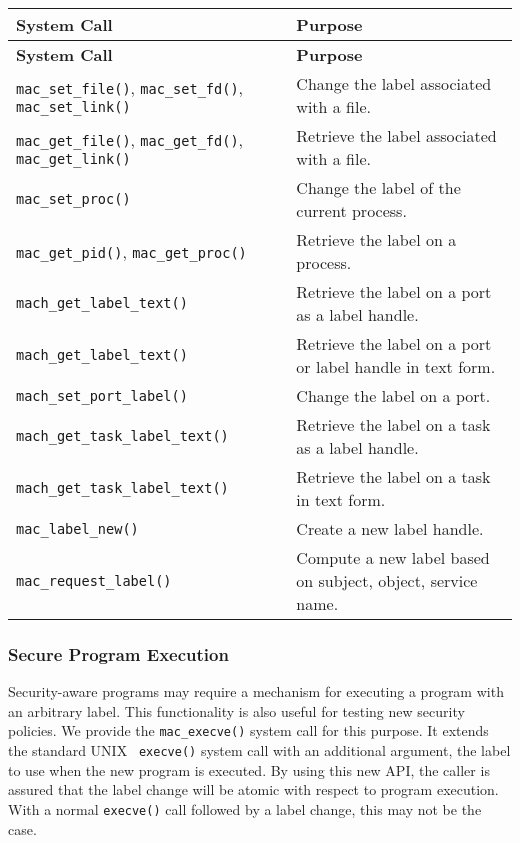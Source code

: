 \begin{longtable}{|p{1.8in}|p{2.2in}|}
\hline
{\bf System Call} & {\bf Purpose} \\
\hline
\hline
\endfirsthead
\hline
{\bf System Call} & {\bf Purpose} \\
\hline
\hline
\endhead
\hline
\endfoot
{\tt mac\_set\_file()}, {\tt mac\_set\_fd()}, {\tt mac\_set\_link()} & Change the label associated with a file. \\[3mm]
\hline
{\tt mac\_get\_file()}, {\tt mac\_get\_fd()}, {\tt mac\_get\_link()} & Retrieve the label associated with a file. \\[3mm]
\hline
{\tt mac\_set\_proc()} & Change the label of the current process. \\[3mm]
\hline
{\tt mac\_get\_pid()}, {\tt mac\_get\_proc()} & Retrieve the label on a process. \\[3mm]
\hline
{\tt mach\_get\_label\_text()} & Retrieve the label on a port as a label handle. \\[3mm]
{\tt mach\_get\_label\_text()} & Retrieve the label on a port or label handle in text form. \\[3mm]
\hline
{\tt mach\_set\_port\_label()} & Change the label on a port. \\[3mm]
\hline
{\tt mach\_get\_task\_label\_text()} & Retrieve the label on a task as a label handle. \\[3mm]
{\tt mach\_get\_task\_label\_text()} & Retrieve the label on a task in text form. \\[3mm]
\hline
{\tt mac\_label\_new()} & Create a new label handle. \\[3mm]
\hline
{\tt mac\_request\_label()} & Compute a new label based on subject, object, service name. \\
\end{longtable}

\subsubsection{Secure Program Execution}
Security-aware programs may require a mechanism for executing a
program with an arbitrary label.  This functionality is also useful
for testing new security policies.  We provide the {\tt mac\_execve()}
system call for this purpose. It extends the standard UNIX {\tt
execve()} system call with an additional argument, the label to use
when the new program is executed.  By using this new API, the caller
is assured that the label change will be atomic with respect to
program execution.  With a normal {\tt execve()} call followed by
a label change, this may not be the case.

